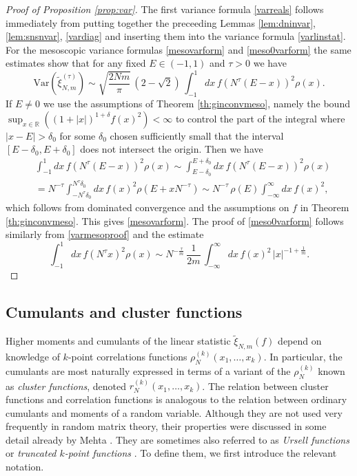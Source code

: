 \documentclass[11pt,reqno]{amsproc}
\numberwithin{equation}{section}
\numberwithin{theorem}{section}
\begin{document}
\begin{proof}[Proof of Proposition \ref{prop:var}]
The first variance formula \eqref{varreals} follows immediately from putting together the preceeding Lemmas \ref{lem:dninvar}, \ref{lem:snsnvar}, \eqref{vardiag} and inserting them into the variance formula \eqref{varlinstat}. For the mesoscopic variance formulas \eqref{mesovarform} and \eqref{meso0varform} the same estimates show that for any fixed $E \in (-1,1)$ and $\tau>0$ we have
\begin{equation}
\mathrm{Var}(\tilde{\xi}_{N,m}^{(\tau)}) \sim \sqrt{\frac{2Nm}{\pi}}\,(2-\sqrt{2})\,\int_{-1}^{1}dx\,f\left(N^{\tau}(E-x)\right)^{2}\rho(x). \label{varmesoproof}
\end{equation} 
If $E \neq 0$ we use the assumptions of Theorem \ref{th:ginconvmeso}, namely the bound $\sup_{x \in \mathbb{R}}((1+|x|)^{1+\delta}f(x)^{2}) < \infty$ to control the part of the integral where $|x-E| > \delta_{0}$ for some $\delta_{0}$ chosen sufficiently small that the interval $[E-\delta_{0},E+\delta_{0}]$ does not intersect the origin. Then we have
\begin{align}
&\int_{-1}^{1}dx\,f\left(N^{\tau}(E-x)\right)^{2}\rho(x)\sim \int_{E-\delta_{0}}^{E+\delta_{0}}dx\,f\left(N^{\tau}(E-x)\right)^{2}\rho(x)\\
&= N^{-\tau}\int_{-N^{\tau}\delta_{0}}^{N^{\tau}\delta_{0}}dx\,f(x)^{2}\rho(E+xN^{-\tau}) \sim N^{-\tau}\,\rho(E)\int_{-\infty}^{\infty}dx\,f(x)^{2},
\end{align}
which follows from dominated convergence and the assumptions on $f$ in Theorem \ref{th:ginconvmeso}. This gives \eqref{mesovarform}. The proof of \eqref{meso0varform} follows similarly from \eqref{varmesoproof} and the estimate
\begin{equation}
\int_{-1}^{1}dx\,f(N^{\tau}x)^{2}\rho(x) \sim N^{-\frac{\tau}{m}}\,\frac{1}{2m}\,\int_{-\infty}^{\infty}dx\,f(x)^{2}\,|x|^{-1+\frac{1}{m}}.
\end{equation}
 \end{proof}


\subsection{Cumulants and cluster functions}
\label{se:cumulants}
Higher moments and cumulants of the linear statistic $\tilde{\xi}_{N,m}(f)$ depend on knowledge of $k$-point correlations functions $\rho^{(k)}_{N}(x_1,\ldots,x_k)$. In particular, the cumulants are most naturally expressed in terms of a variant of the $\rho^{(k)}_{N}$ known as \textit{cluster functions}, denoted $r^{(k)}_{N}(x_1,\ldots,x_k)$. The relation between cluster functions and correlation functions is analogous to the relation between ordinary cumulants and moments of a random variable. Although they are not used very frequently in random matrix theory, their properties were discussed in some detail already by Mehta \cite{Meh04}. They are sometimes also referred to as \textit{Ursell functions} or \textit{truncated $k$-point functions} \cite{NS12,BYY19}. To define them, we first introduce the relevant notation. 
\end{document}
